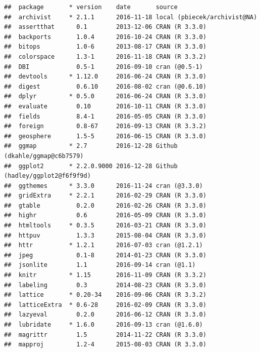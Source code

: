 \documentclass[nojss]{jss}\usepackage[]{graphicx}\usepackage[]{color}
\makeatletter
\newenvironment{kframe}{%
 \def\at@end@of@kframe{}%
 \ifinner\ifhmode%
  \def\at@end@of@kframe{\end{minipage}}%
  \begin{minipage}{\columnwidth}%
 \fi\fi%
 \def\FrameCommand##1{\hskip\@totalleftmargin \hskip-\fboxsep
 \colorbox{shadecolor}{##1}\hskip-\fboxsep
     \hskip-\linewidth \hskip-\@totalleftmargin \hskip\columnwidth}%
 \MakeFramed {\advance\hsize-\width
   \@totalleftmargin\z@ \linewidth\hsize
   \@setminipage}}%
 {\par\unskip\endMakeFramed%
 \at@end@of@kframe}
\newenvironment{knitrout}{}{} %
\makeatother
\begin{document}
\begin{knitrout}
\begin{kframe}
{\ttfamily\noindent\itshape\color{messagecolor}{\#\# Packages ------------------------------------------------------------------}}\begin{verbatim}
##  package       * version    date       source                         
##  archivist     * 2.1.1      2016-11-18 local (pbiecek/archivist@NA)   
##  assertthat      0.1        2013-12-06 CRAN (R 3.3.0)                 
##  backports       1.0.4      2016-10-24 CRAN (R 3.3.0)                 
##  bitops          1.0-6      2013-08-17 CRAN (R 3.3.0)                 
##  colorspace      1.3-1      2016-11-18 CRAN (R 3.3.2)                 
##  DBI             0.5-1      2016-09-10 cran (@0.5-1)                  
##  devtools      * 1.12.0     2016-06-24 CRAN (R 3.3.0)                 
##  digest          0.6.10     2016-08-02 cran (@0.6.10)                 
##  dplyr         * 0.5.0      2016-06-24 CRAN (R 3.3.0)                 
##  evaluate        0.10       2016-10-11 CRAN (R 3.3.0)                 
##  fields          8.4-1      2016-05-05 CRAN (R 3.3.0)                 
##  foreign         0.8-67     2016-09-13 CRAN (R 3.3.2)                 
##  geosphere       1.5-5      2016-06-15 CRAN (R 3.3.0)                 
##  ggmap         * 2.7        2016-12-28 Github (dkahle/ggmap@c6b7579)  
##  ggplot2       * 2.2.0.9000 2016-12-28 Github (hadley/ggplot2@f6f9f9d)
##  ggthemes      * 3.3.0      2016-11-24 cran (@3.3.0)                  
##  gridExtra     * 2.2.1      2016-02-29 CRAN (R 3.3.0)                 
##  gtable          0.2.0      2016-02-26 CRAN (R 3.3.0)                 
##  highr           0.6        2016-05-09 CRAN (R 3.3.0)                 
##  htmltools     * 0.3.5      2016-03-21 CRAN (R 3.3.0)                 
##  httpuv          1.3.3      2015-08-04 CRAN (R 3.3.0)                 
##  httr          * 1.2.1      2016-07-03 cran (@1.2.1)                  
##  jpeg            0.1-8      2014-01-23 CRAN (R 3.3.0)                 
##  jsonlite        1.1        2016-09-14 cran (@1.1)                    
##  knitr         * 1.15       2016-11-09 CRAN (R 3.3.2)                 
##  labeling        0.3        2014-08-23 CRAN (R 3.3.0)                 
##  lattice       * 0.20-34    2016-09-06 CRAN (R 3.3.2)                 
##  latticeExtra  * 0.6-28     2016-02-09 CRAN (R 3.3.0)                 
##  lazyeval        0.2.0      2016-06-12 CRAN (R 3.3.0)                 
##  lubridate     * 1.6.0      2016-09-13 cran (@1.6.0)                  
##  magrittr        1.5        2014-11-22 CRAN (R 3.3.0)                 
##  mapproj         1.2-4      2015-08-03 CRAN (R 3.3.0)                 

\end{verbatim}
\end{kframe}
\end{knitrout}
\end{document}
